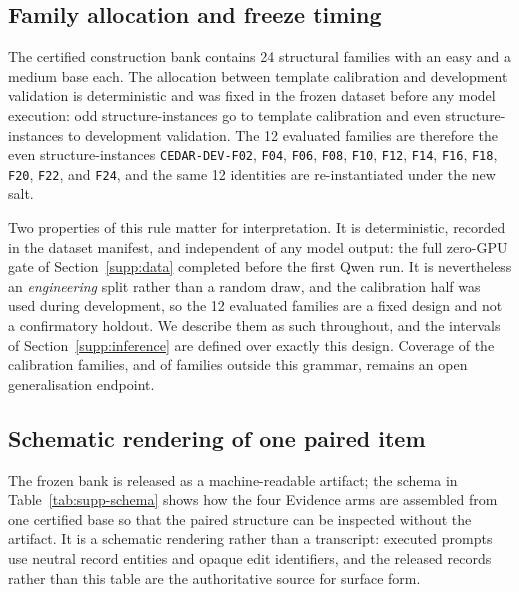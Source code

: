 \documentclass[letterpaper]{article}
\begin{document}
\subsection{Family allocation and freeze timing}

The certified construction bank contains 24 structural families with an easy and a medium base each. The allocation between template calibration and development validation is deterministic and was fixed in the frozen dataset before any model execution: odd structure-instances go to template calibration and even structure-instances to development validation. The 12 evaluated families are therefore the even structure-instances \texttt{CEDAR-DEV-F02}, \texttt{F04}, \texttt{F06}, \texttt{F08}, \texttt{F10}, \texttt{F12}, \texttt{F14}, \texttt{F16}, \texttt{F18}, \texttt{F20}, \texttt{F22}, and \texttt{F24}, and the same 12 identities are re-instantiated under the new salt.

Two properties of this rule matter for interpretation. It is deterministic, recorded in the dataset manifest, and independent of any model output: the full zero-GPU gate of Section~\ref{supp:data} completed before the first Qwen run. It is nevertheless an \emph{engineering} split rather than a random draw, and the calibration half was used during development, so the 12 evaluated families are a fixed design and not a confirmatory holdout. We describe them as such throughout, and the intervals of Section~\ref{supp:inference} are defined over exactly this design. Coverage of the calibration families, and of families outside this grammar, remains an open generalisation endpoint.

\subsection{Schematic rendering of one paired item}

The frozen bank is released as a machine-readable artifact; the schema in Table~\ref{tab:supp-schema} shows how the four Evidence arms are assembled from one certified base so that the paired structure can be inspected without the artifact. It is a schematic rendering rather than a transcript: executed prompts use neutral record entities and opaque edit identifiers, and the released records rather than this table are the authoritative source for surface form.
\end{document}
